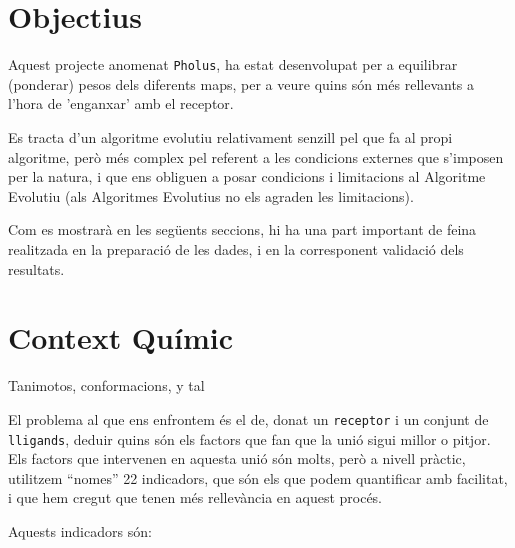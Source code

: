 \documentclass[titlepage,a4paper,12pt]{book}
\begin{document}
\section{Objectius} %
\label{sec:Objectius}
Aquest projecte anomenat \texttt{Pholus}, ha estat desenvolupat per a equilibrar (ponderar) pesos dels
diferents maps, per a veure quins són més rellevants a l'hora de 'enganxar' amb el receptor.  %

Es tracta d'un algoritme evolutiu relativament senzill pel que fa al propi algoritme, però més
complex pel referent a les condicions externes que s'imposen per la natura, i que ens obliguen a
posar condicions i limitacions al Algoritme Evolutiu (als Algoritmes Evolutius no els agraden les 
limitacions).

Com es mostrarà en les següents seccions, hi ha una part important de feina
realitzada en la preparació de les dades, i en la corresponent validació dels
resultats.



\section{Context Químic} %
\label{sec:Context Quimic}
Tanimotos, conformacions, y tal 

El problema al que ens enfrontem és el de, donat un \texttt{receptor} i un conjunt de %
\texttt{lligands}, deduir quins són els factors que fan que la unió sigui millor
o pitjor.  Els factors que intervenen en aquesta unió són molts, però a nivell
pràctic, utilitzem ``nomes'' 22 indicadors, que són els que podem quantificar
amb facilitat, i que hem cregut que tenen més rellevància en aquest procés.

Aquests indicadors són:

\end{document}
